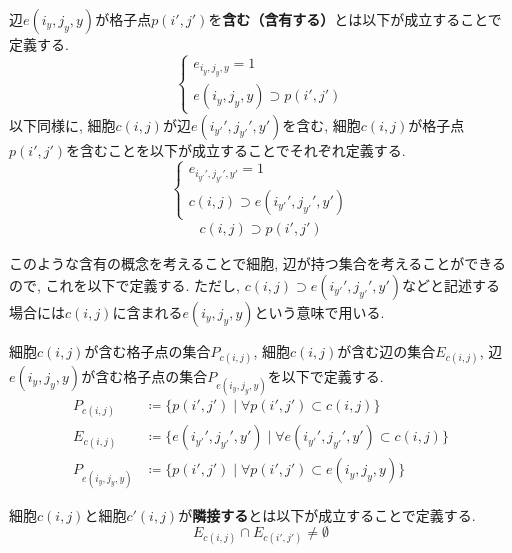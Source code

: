 \begin{definition}[含有]\label{definition:Contain}
  辺$e(i_y,j_y,y)$が格子点$p(i',j')$を\textbf{含む（含有する）}とは以下が成立することで定義する.
  \begin{equation}
    \begin{cases}
      {e_{i_y,j_y,y}=1               } \\
      {e(i_y,j_y,y)\supset p(i',j')}
    \end{cases}
  \end{equation}
  以下同様に, 細胞$c(i,j)$が辺$e(i_{y'}',j_{y'}',y')$を含む, 細胞$c(i,j)$が格子点$p(i',j')$を含むことを以下が成立することでそれぞれ定義する.
  \begin{equation}
    \begin{cases}
      {e_{i_{y'}',j_{y'}',y'}=1 } \\
      {c(i,j)\supset e(i_{y'}',j_{y'}',y')}
    \end{cases}
  \end{equation}
  \begin{align}
    c(i,j)\supset p(i',j')
  \end{align}
\end{definition}
このような含有の概念を考えることで細胞, 辺が持つ集合を考えることができるので, これを以下で定義する. ただし, $c(i,j)\supset e(i_{y'}',j_{y'}',y')$などと記述する場合には$c(i,j)$に含まれる$e(i_y,j_y,y)$という意味で用いる.
\begin{definition}[$P_{c(i,j)}$, $E_{c(i,j)}$, $P_{e(i_y,j_y,y)}$]
  細胞$c(i,j)$が含む格子点の集合$P_{c(i,j)}$, 細胞$c(i,j)$が含む辺の集合$E_{c(i,j)}$, 辺$e(i_y,j_y,y)$が含む格子点の集合$P_{e(i_y,j_y,y)}$を以下で定義する.
  \begin{align}
    P_{c(i,j)}       & \coloneqq \{p(i',j') \mid \forall p(i',j') \subset c(i,j)\}                           \\
    E_{c(i,j)}       & \coloneqq \{e(i_{y'}',j_{y'}',y') \mid \forall e(i_{y'}',j_{y'}',y') \subset c(i,j)\} \\
    P_{e(i_y,j_y,y)} & \coloneqq \{p(i',j') \mid \forall p(i',j') \subset e(i_y,j_y,y)\}
  \end{align}
\end{definition}


\begin{definition}[隣接]\label{definition:Adjacent}
  細胞$c(i,j)$と細胞$c'(i,j)$が\textbf{隣接する}とは以下が成立することで定義する.
  \begin{equation}
    E_{c(i,j)} \cap E_{c(i',j')} \neq \emptyset
  \end{equation}
\end{definition}


